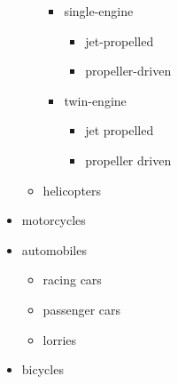 \begin{Example}
\begin{ShowOutput}[\baselineskip]
\begin{itemize}
\begin{itemize}
\begin{itemize}
            \item single-engine
              \begin{itemize}
              \item jet-propelled
              \item propeller-driven
              \end{itemize}
            \item twin-engine
              \begin{itemize}
              \item jet propelled
              \item propeller driven
              \end{itemize}
            \end{itemize}
          \item helicopters
          \end{itemize}
        \item motorcycles
        \item automobiles
          \begin{itemize}
          \item racing cars
          \item passenger cars
          \item lorries
          \end{itemize}
        \item bicycles
        \end{itemize}
      \end{ShowOutput}
    \end{Example}
  \fi
  \EndIndexGroup


